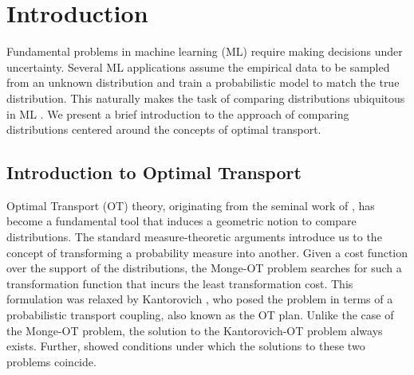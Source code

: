 \chapter{Introduction}\label{chap:intro}
Fundamental problems in machine learning (ML) require making decisions under uncertainty. Several ML applications assume the empirical data to be sampled from an unknown distribution and train a probabilistic model to match the true distribution. This naturally makes the task of comparing distributions ubiquitous in ML \citep{Frogner15,wgan17,Genevay2017LearningGM,bottou2017geometrical,Courty17domAda,damodaran2018deepjdot,cadgan,jumbot,kernelicml23,chen2023plot}. We present a brief introduction to the approach of comparing distributions centered around the concepts of optimal transport.
\section[Introduction to Optimal Transport]{Introduction to Optimal Transport}
Optimal Transport (OT) theory, originating from the seminal work of \cite{monge}, has become a fundamental tool that induces a geometric notion to compare distributions. The standard measure-theoretic arguments introduce us to the concept of transforming a probability measure into another. Given a cost function over the support of the distributions, the Monge-OT problem \citep{monge} searches for such a transformation function that incurs the least transformation cost. This formulation was relaxed by Kantorovich \citep{KatoroOT}, who posed the problem in terms of a probabilistic transport coupling, also known as the OT plan. Unlike the case of the Monge-OT problem, the solution to the Kantorovich-OT problem always exists. Further, \cite{brenier} showed conditions under which the solutions to these two problems coincide.

